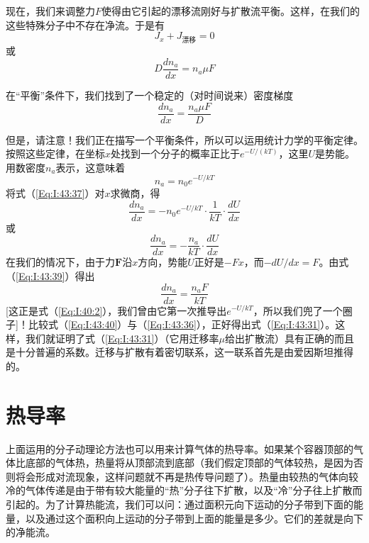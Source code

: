 现在，我们来调整力$F$使得由它引起的漂移流刚好与扩散流平衡。这样，在我们的这些特殊分子中不存在净流。于是有
\begin{equation*}
    J_x+J_\text{漂移}=0
\end{equation*}
或
\begin{equation}
    \label{Eq:I:43:35}
    D\frac{dn_a}{dx} = n_a\mu F
\end{equation}

在“平衡”条件下，我们找到了一个稳定的（对时间说来）密度梯度
\begin{equation}
    \label{Eq:I:43:36}
    \frac{dn_a}{dx} = \frac{n_a\mu F}{D}
\end{equation}

但是，请注意！我们正在描写一个平衡条件，所以可以运用统计力学的平衡定律。按照这些定律，在坐标$x$处找到一个分子的概率正比于$e^{-U/(kT)}$，这里$U$是势能。用数密度$n_a$表示，这意味着
\begin{equation}
    \label{Eq:I:43:37}
    n_a = n_0e^{-U/kT}
\end{equation}
将式（\ref{Eq:I:43:37}）对$x$求微商，得
\begin{equation}
    \label{Eq:I:43:38}
    \frac{dn_a}{dx} = -n_0e^{-U/kT}\cdot\frac{1}{kT}\cdot\frac{dU}{dx}
\end{equation}
或
\begin{equation}
    \label{Eq:I:43:39}
    \frac{dn_a}{dx} = -\frac{n_a}{kT}\cdot\frac{dU}{dx}
\end{equation}
在我们的情况下，由于力$\boldsymbol{F}$沿$x$方向，势能$U$正好是$-Fx$，而$-dU/dx=F$。由式（\ref{Eq:I:43:39}）得出
\begin{equation}
    \label{Eq:I:43:40}
    \frac{dn_a}{dx} = \frac{n_aF}{kT}
\end{equation}
[这正是式（\ref{Eq:I:40:2}），我们曾由它第一次推导出$e^{-U/kT}$，所以我们兜了一个圈子]！比较式（\ref{Eq:I:43:40}）与（\ref{Eq:I:43:36}），正好得出式（\ref{Eq:I:43:31}）。这样，我们就证明了式（\ref{Eq:I:43:31}）（它用迁移率$\mu$给出扩散流）具有正确的而且是十分普遍的系数。迁移与扩散有着密切联系，这一联系首先是由爱因斯坦推得的。

\section{热导率}

上面运用的分子动理论方法也可以用来计算气体的热导率。如果某个容器顶部的气体比底部的气体热，热量将从顶部流到底部（我们假定顶部的气体较热，是因为否则将会形成对流现象，这样问题就不再是热传导问题了）。热量由较热的气体向较冷的气体传递是由于带有较大能量的“热”分子往下扩散，以及“冷”分子往上扩散而引起的。为了计算热能流，我们可以问：通过面积元向下运动的分子带到下面的能量，以及通过这个面积向上运动的分子带到上面的能量是多少。它们的差就是向下的净能流。

